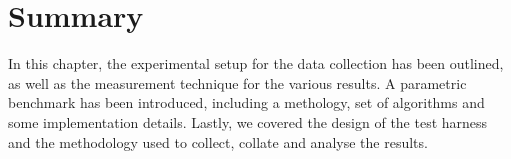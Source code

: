 \section{Summary} \label{sec:methodology/summary}
In this chapter, the experimental setup for the data collection has been outlined, as well as the measurement technique for the various results. A parametric benchmark has been introduced, including a methology, set of algorithms and some implementation details. Lastly, we covered the design of the test harness and the methodology used to collect, collate and analyse the results.